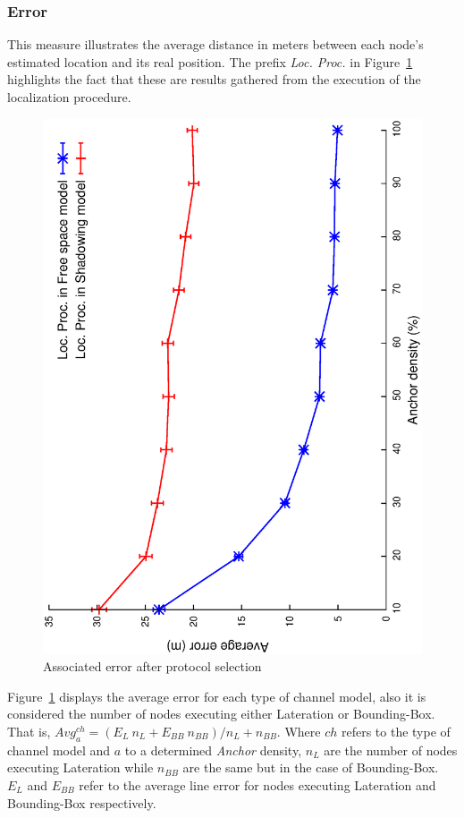 \subsubsection{Error}
This measure illustrates the average distance in meters between each node's estimated location and its real position. The prefix \emph{Loc. Proc.} in Figure~\ref{pme:error} highlights the fact that these are results gathered from the execution of the localization procedure.

\begin{figure}[htbp]
  \centering
  \includegraphics[width=0.7\linewidth, angle = -90]{section4/figures/pmeAverageErrorPerProtocol.eps}
  \caption{Associated error after protocol selection
  \label{pme:error}}
\end{figure}

Figure~\ref{pme:error} displays the average error for each type of channel model, also it is considered the number of nodes executing either Lateration or Bounding-Box. That is, $Avg_{a}^{ch} = (E_{L}~n_{L} + E_{BB}~n_{BB}) /n_{L}+n_{BB}$. Where $ch$ refers to the type of channel model and $a$ to a determined \emph{Anchor} density, $n_{L}$ are the number of nodes executing Lateration while $n_{BB}$ are the same but in the case of Bounding-Box. $E_{L}$ and $E_{BB}$ refer to the average line error for nodes executing Lateration and Bounding-Box respectively.

